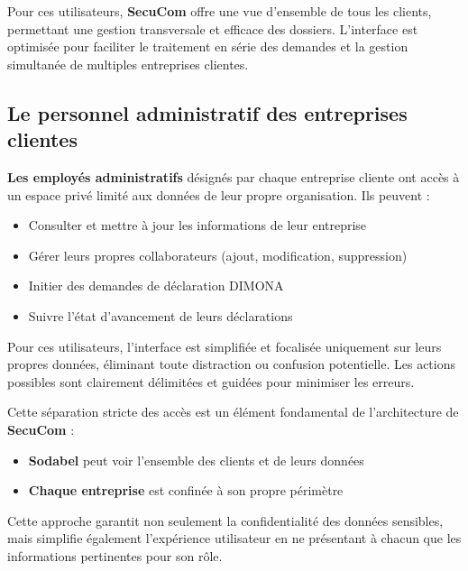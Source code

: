 \vspace{0.5cm}

\noindent Pour ces utilisateurs, \textbf{SecuCom} offre une vue d'ensemble de tous les clients, permettant une gestion transversale et efficace des dossiers. L'interface est optimisée pour faciliter le traitement en série des demandes et la gestion simultanée de multiples entreprises clientes.

\subsection{Le personnel administratif des entreprises clientes}

\textbf{Les employés administratifs} désignés par chaque entreprise cliente ont accès à un espace privé limité aux données de leur propre organisation. Ils peuvent :
\begin{itemize}[leftmargin=*,label=\textcolor{darkgray}{$\bullet$},itemsep=0.3em]
  \item Consulter et mettre à jour les informations de leur entreprise
  \item Gérer leurs propres collaborateurs (ajout, modification, suppression)
  \item Initier des demandes de déclaration DIMONA
  \item Suivre l'état d'avancement de leurs déclarations
\end{itemize}

\vspace{0.5cm}

\noindent Pour ces utilisateurs, l'interface est simplifiée et focalisée uniquement sur leurs propres données, éliminant toute distraction ou confusion potentielle. Les actions possibles sont clairement délimitées et guidées pour minimiser les erreurs.

\begin{tcolorbox}[
  title={\textbf{Séparation des accès}},
  colback=blue!5!white,
  colframe=primarycolor,
  fonttitle=\bfseries,
  boxrule=0.5mm,
  arc=2mm,
  left=6mm,
  right=6mm,
  top=6mm,
  bottom=6mm
]
\noindent Cette séparation stricte des accès est un élément fondamental de l'architecture de \textbf{SecuCom} :
\begin{itemize}[leftmargin=*,label=\textcolor{darkgray}{$\bullet$},itemsep=0.3em]
  \item \textbf{Sodabel} peut voir l'ensemble des clients et de leurs données
  \item \textbf{Chaque entreprise} est confinée à son propre périmètre
\end{itemize}

\noindent Cette approche garantit non seulement la confidentialité des données sensibles, mais simplifie également l'expérience utilisateur en ne présentant à chacun que les informations pertinentes pour son rôle.
\end{tcolorbox}

